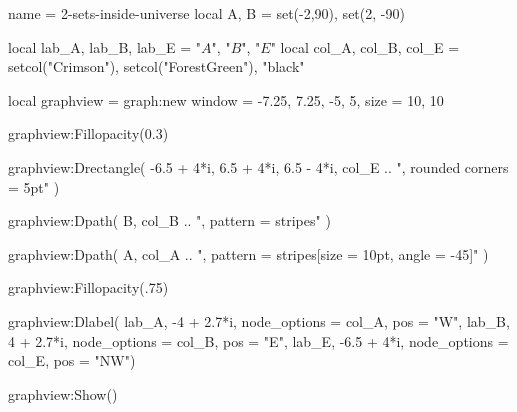 \documentclass{standalone}
\begin{document}
\begin{luadraw}{name = 2-sets-inside-universe}
  local A, B = set(-2,90), set(2, -90)

  local lab_A, lab_B, lab_E = "$A$", "$B$", "$E$"
  local col_A, col_B, col_E = setcol("Crimson"), setcol("ForestGreen"), "black"

  local graphview = graph:new{
    window = {-7.25, 7.25, -5, 5},
    size   = {10, 10}
  }

  graphview:Fillopacity(0.3)

  graphview:Drectangle(
    -6.5 + 4*i, 6.5 + 4*i, 6.5 - 4*i,
    col_E .. ", rounded corners = 5pt"
  )

  graphview:Dpath(
    B,
    col_B .. ", pattern = stripes"
  )

  graphview:Dpath(
    A,
    col_A .. ", pattern = {stripes[size = 10pt, angle = -45]}"
  )

  graphview:Fillopacity(.75)

  graphview:Dlabel(
    lab_A, -4   + 2.7*i, {node_options = col_A, pos = "W"},
    lab_B,  4   + 2.7*i, {node_options = col_B, pos = "E"},
    lab_E, -6.5 +   4*i, {node_options = col_E, pos = "NW"})

  graphview:Show()
\end{luadraw}
\end{document}
